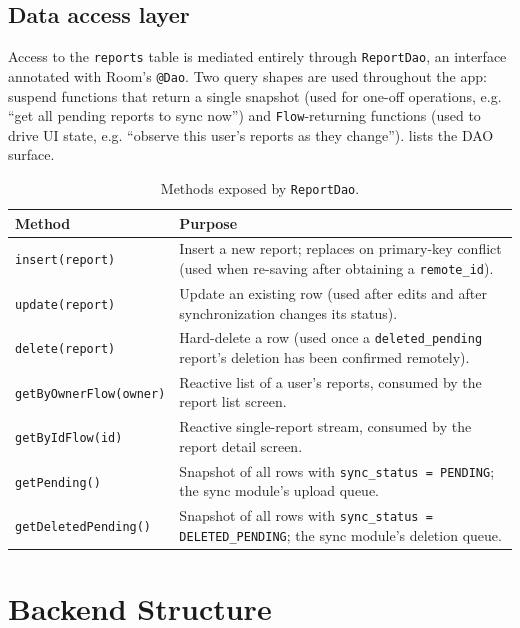 \subsection{Data access layer}

Access to the \texttt{reports} table is mediated entirely through
\texttt{ReportDao}, an interface annotated with Room's \texttt{@Dao}. Two
query shapes are used throughout the app: suspend functions that return a
single snapshot (used for one-off operations, e.g. \enquote{get all
pending reports to sync now}) and \texttt{Flow}-returning functions (used
to drive UI state, e.g. \enquote{observe this user's reports as they
change}).  lists the DAO surface.

\begin{table}[htbp]
\centering
\caption{Methods exposed by \texttt{ReportDao}.}
\label{tab:dao-methods}
\begin{tabularx}{\textwidth}{@{}l X@{}}
\toprule
\textbf{Method} & \textbf{Purpose} \\
\midrule
\texttt{insert(report)} & Insert a new report; replaces on primary-key
conflict (used when re-saving after obtaining a \texttt{remote\_id}). \\
\texttt{update(report)} & Update an existing row (used after edits and
after synchronization changes its status). \\
\texttt{delete(report)} & Hard-delete a row (used once a
\texttt{deleted\_pending} report's deletion has been confirmed remotely). \\
\texttt{getByOwnerFlow(owner)} & Reactive list of a user's reports,
consumed by the report list screen. \\
\texttt{getByIdFlow(id)} & Reactive single-report stream, consumed by the
report detail screen. \\
\texttt{getPending()} & Snapshot of all rows with
\texttt{sync\_status = PENDING}; the sync module's upload queue. \\
\texttt{getDeletedPending()} & Snapshot of all rows with
\texttt{sync\_status = DELETED\_PENDING}; the sync module's deletion queue. \\
\bottomrule
\end{tabularx}
\end{table}

\section{Backend Structure}
\label{sec:backend-design}

